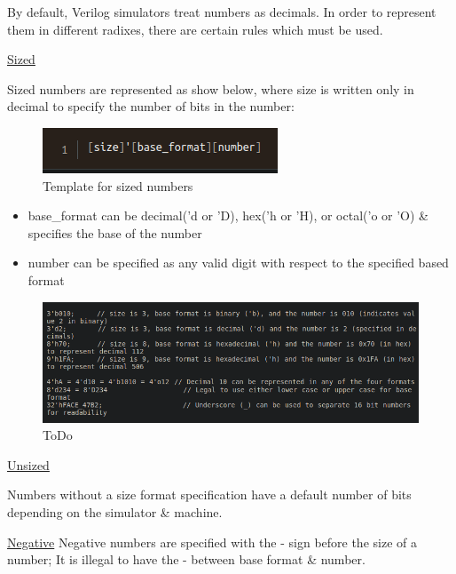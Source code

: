 \documentclass{article}
\begin{document}
	By default, Verilog simulators treat numbers as decimals. In order to represent them in different radixes, there are certain rules which must be used. \newline

	\underline{Sized}

	Sized numbers are represented as show below, where size is written only in decimal to specify the number of bits in the number:

	\begin{figure}[H]
		\includegraphics[width=\linewidth]{VerilogPics/figure_5.png}
		\caption{Template for sized numbers}
		\label{Template for sized numbers}
	\end{figure}

	\begin{itemize}
		\item base\_format can be decimal('d or 'D), hex('h or 'H), or octal('o or 'O) \& specifies the base of the number
		\item number can be specified as any valid digit with respect to the specified based format
	\end{itemize}

	\begin{figure}[H]
		\includegraphics[width=\linewidth]{VerilogPics/figure_6.png}
		\caption{ToDo}
		\label{ToDo}
	\end{figure}

	\underline{Unsized}

	Numbers without a size format specification have a default number of bits depending on the simulator \& machine.

	\underline{Negative} \newline
	Negative numbers are specified with the - sign before the size of a number; It is illegal to have the - between base format \& number.
\end{document}
